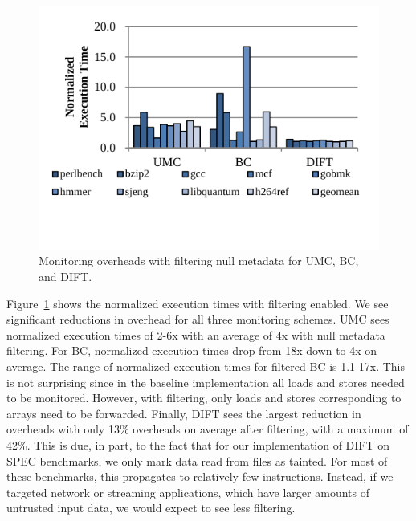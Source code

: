 \begin{figure}
  \begin{center}
    \includegraphics[width=\columnwidth]{figs/data_filtering.pdf}
    \vspace{-0.2in}
    \caption{Monitoring overheads with filtering null metadata for UMC, BC, and DIFT.}
    \label{fig:evaluation.filtering}
    \vspace{-0.1in}
  \end{center}
\end{figure}

Figure~\ref{fig:evaluation.filtering} shows the
normalized execution times with filtering enabled. We see significant
reductions in overhead for all three monitoring schemes. UMC sees normalized
execution times of 2-6x with an average of 4x with null metadata filtering. For BC, normalized execution
times drop from 18x down to 4x on average. The range of normalized execution
times for filtered BC is 1.1-17x. This is not surprising since in the baseline
implementation all loads and stores needed to be monitored. However, with
filtering, only loads and stores corresponding to arrays need to be forwarded.
Finally, DIFT sees the largest reduction in overheads with only 13\% overheads
on average after filtering, with a maximum of 42\%. This is due, in part, to the fact that
for our implementation of DIFT on SPEC
benchmarks, we only mark data read from files as tainted. For most of these
benchmarks, this propagates to relatively few instructions. Instead, if we
targeted network or streaming applications, which have larger amounts of
untrusted input data, we would expect to see less filtering.

